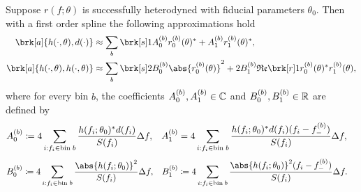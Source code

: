 %
\begin{proposition}[]\label{}
Suppose $r(f;\theta)$ is successfully heterodyned with fiducial parameters $\theta_0$.
Then with a first order spline the following approximations hold
\begin{align*}
\brk[a]{h(\cdot, \theta), d(\cdot)} &\approx \sum_b \brk[s]1{A_0^{(b)} r_0^{(b)}(\theta)^* + A_1^{(b)} r_1^{(b)}(\theta)^*}, \\
\brk[a]{h(\cdot,\theta), h(\cdot,\theta)} &\approx \sum_b \brk[s]2{B_0^{(b)} \abs{r_0^{(b)}(\theta)}^2 + 2 B_1^{(b)} \re \brk[r]1{r_0^{(b)}(\theta)^* r_1^{(b)}(\theta)}},
\end{align*}
where for every bin $b$, the coefficients $A_0^{(b)}, A_1^{(b)} \in \mathbb{C}$ and $B_0^{(b)}, B_1^{(b)} \in \mathbb{R}$ are defined by
\begin{align*}
A_0^{(b)} &\coloneqq 4 \sum_{i: f_i \in \text{bin} \; b} \frac{ h(f_i;\theta_0)^* d(f_i) }{S(f_i)} \Delta f, & A_1^{(b)} &= 4 \sum_{i:f_i \in \text{bin} \; b} \frac{ h(f_i;\theta_0)^*d(f_i) (f_i - f_-^{(b)})}{S(f_i)} \Delta f,
\end{align*}
%
\begin{align*}
B_0^{(b)} &\defn 4 \sum_{i:f_i \in \text{bin} \; b} \frac{\abs{h(f_i;\theta_0)}^2}{S(f_i)}\Delta f, & B_1^{(b)} &\defn 4 \sum_{i:f_i \in \text{bin} \: b} \frac{\abs{h(f_i;\theta_0)}^2(f_i-f_-^{(b)})}{S(f_i)}\Delta f.
\end{align*}
\end{proposition}
